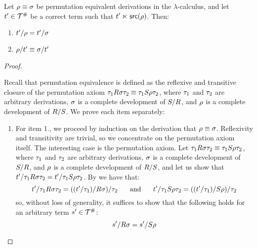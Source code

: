 \begin{proposition}[Compatibility] %
Let $\rho \equiv \sigma$ be permutation equivalent derivations in the $\lambda$-calculus,
and let $t' \in \mathcal{T}^{\mathtt{\#}}$ be a correct term such that $t' \mathrel{\ltimes} \mathsf{src}(\rho)$.
Then:
\begin{enumerate}
\item $t'/\rho = t'/\sigma$
\item $\rho/t' \equiv \sigma/t'$
\end{enumerate}
\end{proposition}
\begin{proof}
\begin{pabloenv}
Recall that permutation equivalence is defined as the reflexive and transitive closure of the
permutation axiom $\tau_1 R \sigma \tau_2 \equiv \tau_1 S \rho \tau_2$,
where
$\tau_1$ and $\tau_2$ are arbitrary derivations,
$\sigma$ is a complete development of $S/R$,
and $\rho$ is a complete development of $R/S$.
We prove each item separately:
\begin{enumerate}
\item
  For item 1., we proceed by induction on the derivation that $\rho \equiv \sigma$.
  Reflexivity and transitivity are trivial, so we concentrate on the permutation axiom itself.
  The interesting case is the permutation axiom.
  Let $\tau_1 R \sigma \tau_2 \equiv \tau_1 S \rho \tau_2$,
  where
  $\tau_1$ and $\tau_2$ are arbitrary derivations,
  $\sigma$ is a complete development of $S/R$,
  and $\rho$ is a complete development of $R/S$,
  and let us show that $t'/\tau_1 R \sigma \tau_2 = t'/\tau_1 S \rho \tau_2$.
  By  we have that:
  \[
    t'/\tau_1 R \sigma \tau_2 = ((t'/\tau_1)/R \sigma)/\tau_2
    \hspace{.5cm}
    \text{ and }
    \hspace{.5cm}
    t'/\tau_1 S \rho \tau_2 = ((t'/\tau_1)/S \rho)/ \tau_2
  \]
  so, without loss of generality,
  it suffices to show that the following holds for an arbitrary term $s' \in \mathcal{T}^{\mathtt{\#}}$:
  \[
    s'/R\sigma = s'/S\rho
\]
\end{enumerate}
\end{pabloenv}
\end{proof}
